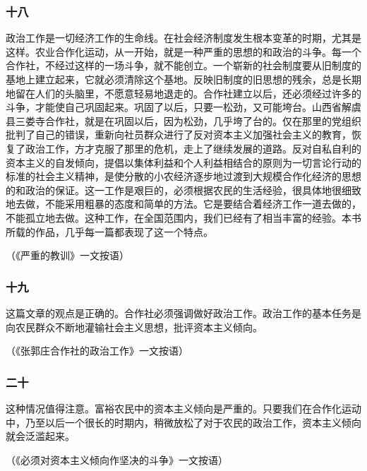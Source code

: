 \documentclass[cn,11pt,chinese]{elegantbook}
\def\myformat#1{\hfil\hfil #1}
\begin{document}
\subsubsection*{\myformat{十八}}
政治工作是一切经济工作的生命线。在社会经济制度发生根本变革的时期，尤其是这样。农业合作化运动，从一开始，就是一种严重的思想的和政治的斗争。每一个合作社，不经过这样的一场斗争，就不能创立。一个崭新的社会制度要从旧制度的基地上建立起来，它就必须清除这个基地。反映旧制度的旧思想的残余，总是长期地留在人们的头脑里，不愿意轻易地退走的。合作社建立以后，还必须经过许多的斗争，才能使自己巩固起来。巩固了以后，只要一松劲，又可能垮台。山西省解虞县三娄寺合作社，就是在巩固以后，因为松劲，几乎垮了台的。仅在那里的党组织批判了自己的错误，重新向社员群众进行了反对资本主义加强社会主义的教育，恢复了政治工作，方才克服了那里的危机，走上了继续发展的道路。反对自私自利的资本主义的自发倾向，提倡以集体利益和个人利益相结合的原则为一切言论行动的标准的社会主义精神，是使分散的小农经济逐步地过渡到大规模合作化经济的思想的和政治的保证。这一工作是艰巨的，必须根据农民的生活经验，很具体地很细致地去做，不能采用粗暴的态度和简单的方法。它是要结合着经济工作一道去做的，不能孤立地去做。这种工作，在全国范围内，我们已经有了相当丰富的经验。本书所载的作品，几乎每一篇都表现了这一个特点。\\
\begin{flushright}（《严重的教训》一文按语）\end{flushright}
\subsubsection*{\myformat{十九}}
这篇文章的观点是正确的。合作社必须强调做好政治工作。政治工作的基本任务是向农民群众不断地灌输社会主义思想，批评资本主义倾向。\\
\begin{flushright}（《张郭庄合作社的政治工作》一文按语）\end{flushright}
\subsubsection*{\myformat{二十}}
这种情况值得注意。富裕农民中的资本主义倾向是严重的。只要我们在合作化运动中，乃至以后一个很长的时期内，稍微放松了对于农民的政治工作，资本主义倾向就会泛滥起来。\\
\begin{flushright}（《必须对资本主义倾向作坚决的斗争》一文按语）\end{flushright}
\end{document}

